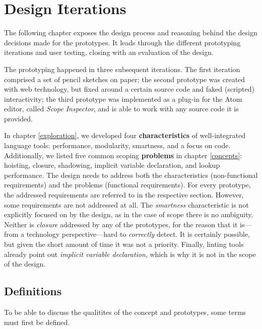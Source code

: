 \chapter{Design Iterations}\label{design}

The following chapter exposes the design process and reasoning behind
the design decisions made for the prototypes. It leads through the
different prototyping iterations and user testing, closing with an
evaluation of the design.

The prototyping happened in three subsequent iterations. The first
iteration comprised a set of pencil sketches on paper; the second
prototype was created with web technology, but fixed around a certain
source code and faked (scripted) interactivity; the third prototype was
implemented as a plug-in for the Atom editor, called \emph{Scope
Inspector}, and is able to work with any source code it is provided.

In chapter \ref{exploration}, we developed four \textbf{characteristics}
of well-integrated language tools: performance, modularity, smartness,
and a focus on code. Additionally, we listed five common scoping
\textbf{problems} in chapter \ref{concepts}: hoisting, closure,
shadowing, implicit variable declaration, and lookup performance. The
design needs to address both the characteristics (non-functional
requirements) and the problems (functional requirements). For every
prototype, the addressed requirements are referred to in the respective
section. However, some requirements are not addressed at all. The
\emph{smartness} characteristic is not explicitly focused on by the
design, as in the case of scope there is no ambiguity. Neither is
\emph{closure} addressed by any of the prototypes, for the reason that
it is—from a technology perspective—hard to \emph{correctly} detect. It
is certainly possible, but given the short amount of time it was not a
priority. Finally, linting tools already point out \emph{implicit
variable declaration}, which is why it is not in the scope of the
design.

\section{Definitions}\label{definitions}

To be able to discuss the qualitites of the concept and prototypes, some
terms must first be defined.

